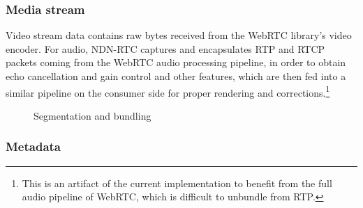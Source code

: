 \documentclass{icn/sig-alternate-2013} %
\newcommand{\ndnrtcName}{NDN-RTC} %
\begin{document}
\subsubsection{Media stream}
Video stream data contains raw bytes received from the WebRTC library's video encoder. For audio, \ndnrtcName{} captures and encapsulates RTP and RTCP packets coming from the WebRTC audio processing pipeline, in order to obtain echo cancellation and gain control and other features, which are then fed into a similar pipeline on the consumer side for proper rendering and corrections.\footnote{This is an artifact of the current implementation to benefit from the full audio pipeline of WebRTC, which is difficult to unbundle from RTP.}

\begin{figure}[t!]
\centering
{}
\caption{Segmentation and bundling}
\label{fig:packetmeta}
\end{figure}

\subsubsection{Metadata}
\end{document}

